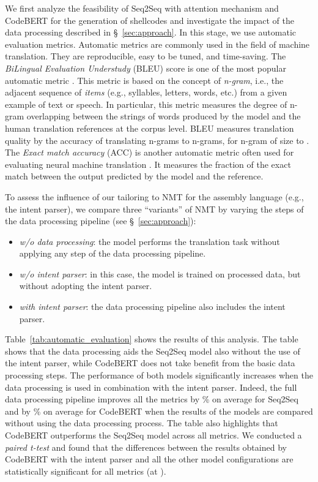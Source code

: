 We first analyze the feasibility of Seq2Seq with attention mechanism and CodeBERT for the generation of shellcodes and investigate the impact of the data processing described in \S{}~\ref{sec:approach}. In this stage, we use automatic evaluation metrics. 
Automatic metrics are commonly used in the field of machine translation. They are reproducible, easy to be tuned, and time-saving. The \emph{BiLingual Evaluation Understudy} (BLEU) \cite{papineni2002bleu} score is one of the most popular automatic metric \cite{oda2015learning,DBLP:journals/corr/LingGHKSWB16,gemmell2020relevance,tran2019does}. This metric is based on the concept of \textit{n-gram}, i.e., the adjacent sequence of  \textit{items} (e.g., syllables, letters, words, etc.) from a given example of text or speech. In particular, this metric measures the degree of n-gram overlapping between the strings of words produced by the model and the human translation references at the corpus level. BLEU measures translation quality by the accuracy of translating n-grams to n-grams, for n-gram of size  to  \cite{han2016machine}.
The \emph{Exact match accuracy} (ACC) is another automatic metric often used for evaluating neural machine translation  \cite{DBLP:journals/corr/LingGHKSWB16,yin2017syntactic,yin2018tranx,yin2019reranking}. It measures the fraction of the exact match between the output predicted by the model and the reference.

To assess the influence of our tailoring to NMT for the assembly language (e.g., the intent parser), we compare three ``variants'' of NMT by varying the steps of the data processing pipeline (see \S~\ref{sec:approach}):
\begin{itemize}
    \item \textit{w/o data processing}: the model performs the translation task without applying any step of the data processing pipeline. 
    \item \textit{w/o intent parser}: in this case, the model is trained on processed data, but without adopting the intent parser.
    \item \textit{with intent parser}: the data processing pipeline also includes the intent parser. 
\end{itemize}

Table~\ref{tab:automatic_evaluation} shows the results of this analysis. 
The table shows that the data processing aids the Seq2Seq model also without the use of the intent parser, while CodeBERT does not take benefit from the basic data processing steps. The performance of both models significantly increases when the data processing is used in combination with the intent parser. Indeed, the full data processing pipeline improves all the metrics by \% on average for Seq2Seq and by \% on average for CodeBERT when the results of the models are compared without using the data processing process. 
The table also highlights that CodeBERT outperforms the Seq2Seq model across all metrics. We conducted a \textit{paired t-test} and found that the differences between the results obtained by CodeBERT with the intent parser and all the other model configurations are statistically significant for all metrics (at ). 


